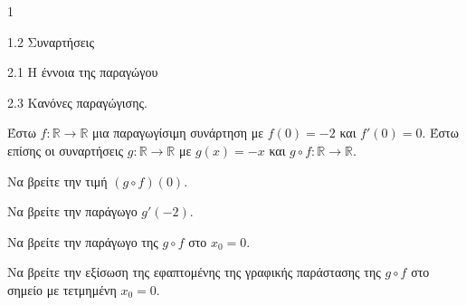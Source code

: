 \begin{ylh}{1}
    \item 1.2 Συναρτήσεις
    \item 2.1 Η έννοια της παραγώγου
    \item 2.3 Κανόνες παραγώγισης.
\end{ylh}
Έστω $f : \mathbb{R} \to \mathbb{R}$ μια παραγωγίσιμη συνάρτηση με $f (0) = -2$ και $f'(0) = 0$. Έστω επίσης οι συναρτήσεις $g: \mathbb{R} \to \mathbb{R}$ με $g(x) = -x$ και $g \circ f : \mathbb{R} \to \mathbb{R}$.
\begin{alist}
    \item Να βρείτε την τιμή $(g \circ f)(0)$. 
    \item Να βρείτε την παράγωγο $g'(-2)$. 
    \item Να βρείτε την παράγωγο της $g \circ f$ στο $x_0 = 0$. 
    \item Να βρείτε την εξίσωση της εφαπτομένης της γραφικής παράστασης της $g \circ f$ στο σημείο με τετμημένη $x_0 = 0$. 
\end{alist}